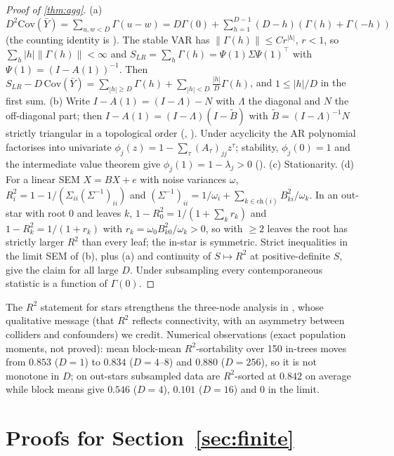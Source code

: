 \begin{proof}[Proof of \cref{thm:agg}]
(a) $D^2\mathrm{Cov}(\bar Y)=\sum_{u,w<D}\Gamma(u-w)=D\Gamma(0)+\sum_{h=1}^{D-1}(D-h)(\Gamma(h)+\Gamma(-h))$
(the counting identity is ). The stable VAR has
$\|\Gamma(h)\|\le C r^{|h|}$, $r<1$, so $\sum_h|h|\|\Gamma(h)\|<\infty$ and
$S_{LR}=\sum_h\Gamma(h)=\Psi(1)\Sigma\Psi(1)^\top$ with
$\Psi(1)=(I-A(1))^{-1}$. Then
$S_{LR}-D\,\mathrm{Cov}(\bar Y)=\sum_{|h|\ge D}\Gamma(h)+\sum_{|h|<D}\frac{|h|}{D}\Gamma(h)$,
and $1\le|h|/D$ in the first sum.
(b) Write $I-A(1)=(I-\Lambda)-N$ with $\Lambda$ the diagonal and $N$ the
off-diagonal part; then $I-A(1)=(I-\Lambda)(I-\tilde B)$ with
$\tilde B=(I-\Lambda)^{-1}N$ strictly triangular in a topological order
(, ). Under acyclicity the AR
polynomial factorises into univariate $\phi_j(z)=1-\sum_\tau(A_\tau)_{jj}z^\tau$;
stability, $\phi_j(0)=1$ and the intermediate value theorem give
$\phi_j(1)=1-\lambda_j>0$ ().
(c) Stationarity.
(d) For a linear SEM $X=BX+e$ with noise variances $\omega$,
$R^2_i=1-1/(\Sigma_{ii}(\Sigma^{-1})_{ii})$ and
$(\Sigma^{-1})_{ii}=1/\omega_i+\sum_{k\in\mathrm{ch}(i)}B_{ki}^2/\omega_k$. In
an out-star with root $0$ and leaves $k$, $1-R^2_0=1/(1+\sum_kr_k)$ and
$1-R^2_k=1/(1+r_k)$ with $r_k=\omega_0B_{k0}^2/\omega_k>0$, so with $\ge2$
leaves the root has strictly larger $R^2$ than every leaf; the in-star is
symmetric. Strict inequalities in the limit SEM of (b), plus (a) and
continuity of $S\mapsto R^2$ at positive-definite $S$, give the claim for all
large $D$. Under subsampling every contemporaneous statistic is a function of
$\Gamma(0)$.
\end{proof}

The $R^2$ statement for stars strengthens the three-node analysis in
\citet[App.~D]{herman2025unitless}, whose qualitative message (that $R^2$
reflects connectivity, with an asymmetry between colliders and confounders)
we credit. Numerical observations (exact population moments, not proved):
mean block-mean $R^2$-sortability over 150 in-trees moves from $0.853$
($D=1$) to $0.834$ ($D=4$--$8$) and $0.880$ ($D=256$), so it is not monotone in
$D$; on out-stars subsampled data are $R^2$-sorted at $0.842$ on average while
block means give $0.546$ ($D=4$), $0.101$ ($D=16$) and $0$ in the limit.

\section{Proofs for Section~\ref{sec:finite}}
\label{app:finite}

